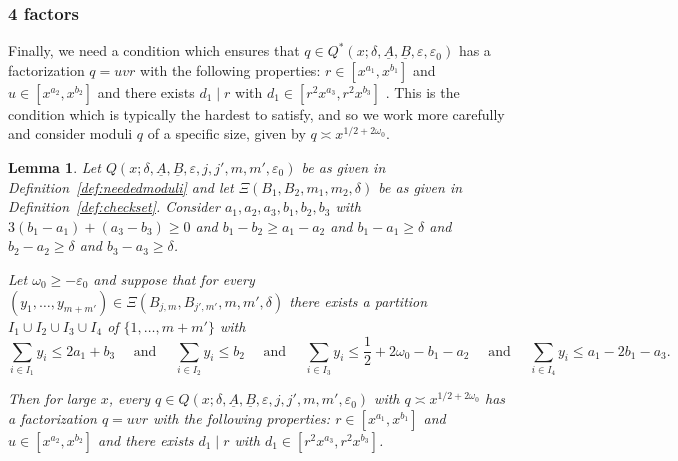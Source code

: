 \documentclass{amsart}
\newtheorem{lemma}{Lemma}
\numberwithin{equation}{section}
\begin{document}
\subsubsection{4 factors}

Finally, we need a  condition which ensures that $q \in Q^*(x;\delta,\underline{A},\underline{B},\varepsilon,\varepsilon_0)$ has a factorization $q=uvr$ with the following properties: $r \in [x^{a_1},x^{b_1}]$ and $u \in [x^{a_2},x^{b_2}]$ and    there exists $d_1 \mid r$ with $d_1 \in [r^2x^{a_3},r^2x^{b_3}]$ . This is the condition which is typically the hardest to satisfy, and so we work more carefully and consider moduli $q$ of a specific size, given by $q \asymp x^{1/2+2\omega_0}$.

 
 
\begin{lemma}\label{lem:partition3} Let $Q(x;\delta,\underline{A},\underline{B},\varepsilon,j,j',m,m',\varepsilon_0)$ be as given in Definition~\ref{def:neededmoduli} and let $\Xi(B_1,B_2,m_1,m_2,\delta)$ be as given in Definition~\ref{def:checkset}. 
 Consider $a_1, a_2, a_3, b_1, b_2, b_3$   with   $3(b_1 - a_1) + (a_3 -b_3)\geq 0$ and $b_1 -b_2 \geq a_1-a_2$ and $b_1-a_1 \geq \delta$ and $b_2-a_2 \geq \delta$ and $b_3-a_3 \geq \delta$.
 
 \smallskip
 Let $\omega_0 \geq -\varepsilon_0$ and suppose  that for every  $(y_1, \dots, y_{m+m'}) \in \Xi(B_{j,m},B_{j',m'},m,m',\delta)$  there exists a   partition $I_1 \cup I_2 \cup I_3 \cup I_4 $ of $\{1, \dots, m+m'\}$ with 
$$ \sum_{i \in I_1} y_i \leq 2a_1+b_3 \quad \mbox{ and } \quad  \sum_{i \in I_2} y_i \leq  b_2  
\quad \mbox{ and } \quad  \sum_{i \in I_3} y_i \leq  \frac{1}{2} +2\omega_0 - b_1 -a_2  \quad \mbox{ and } \quad  \sum_{i \in I_4} y_i \leq a_1 -2b_1-a_3. $$

Then for   large $x$, every $q \in Q(x;\delta,\underline{A},\underline{B},\varepsilon,j,j',m,m',\varepsilon_0)$ with $q \asymp x^{1/2+2\omega_0}$ has a factorization  $q=uvr$ with the following properties: $r \in [x^{a_1},x^{b_1}]$ and $u \in [x^{a_2},x^{b_2}]$ and    there exists $d_1 \mid r$ with $d_1 \in [r^2x^{a_3},r^2x^{b_3}]$. 
\end{lemma} 
\end{document}
